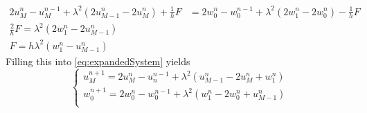 \documentclass[dvipsnames]{article}
\begin{document}
\begin{align}
    2u_M^n - u_M^{n-1} + \lambda^2(2u_{M-1}^n-2u_M^n) + \frac{1}{h} F &=
    2w_0^n - w_0^{n-1} + \lambda^2(2w_1^n-2w_0^n) - \frac{1}{h} F\nonumber\\
    \frac{2}{h}F = \lambda^2(2w_1^n - 2u_{M-1}^n)\nonumber\\
    F = h \lambda^2(w_1^n - u_{M-1}^n)
\end{align}
Filling this into \eqref{eq:expandedSystem} yields
\begin{equation}
    \begin{cases}
    u^{n+1}_M = 2u_M^n - u_n^{n-1} + \lambda^2(u_{M-1}^n-2u_M^n+w_1^n)\\
    w^{n+1}_0 = 2w_0^n - w_0^{n-1} + \lambda^2(w_1^n-2w_0^n+u_{M-1}^n)\\
    \end{cases}
\end{equation}
\end{document}
